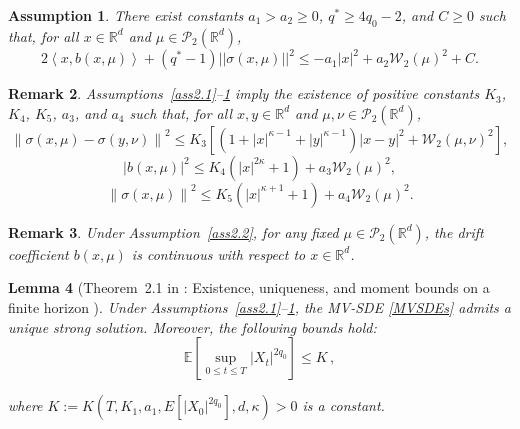 \documentclass[12pt]{article}
\numberwithin{equation}{section}
\newtheorem{assumption}{Assumption}[section]
\newtheorem{remark}[assumption]{Remark}
\newtheorem{lemma}[assumption]{Lemma}
\begin{document}
\begin{assumption}\label{ass2.4}
There exist constants $a_1>a_2\geq 0$, $q^*\geq 4q_0-2$, and $C\geq 0$ such that, for all $x \in \mathbb{R}^d$ and $\mu \in \mathcal{P}_2\left(\mathbb{R}^d\right)$,
\begin{equation}\tag{2.13}\label{2.13}
2\left\langle x, b\left(x, \mu\right)\right\rangle+\left(q^*-1\right)\left|\left|\sigma\left(x, \mu\right)\right|\right|^2 \leq-a_1\left|x\right|^2+a_2 \mathcal{W}_2\left(\mu\right)^2+C.
\end{equation}
\end{assumption}
\begin{remark}\label{remark 2.5}
 Assumptions~\ref{ass2.1}--\ref{ass2.4} imply the existence of positive constants $K_3$, $K_4$, $K_5$, $a_3$, and $a_4$ such that, for all $x, y \in \mathbb{R}^d$ and $\mu, \nu \in \mathcal{P}_2\left(\mathbb{R}^d\right)$,
\begin{equation}\tag{2.14}\label{2.14}
\left\|\sigma \left( x,\mu \right) -\sigma \left( y,\nu \right) \right\|^2\leq K_3\left[ \left( 1+\left|x\right|^{\kappa -1}+\left|y\right|^{\kappa -1} \right) \left|x-y\right|^2+\mathcal{W}_2\left( \mu ,\nu \right) ^2 \right] ,
    \end{equation}
    \begin{equation}\tag{2.15}\label{2.15}
    \left|b\left( x,\mu \right) \right|^2\leq K_4\left( \left|x\right|^{2\kappa}+1 \right) +a_3\mathcal{W}_2\left( \mu \right) ^2 ,
    \end{equation}
    \begin{equation}\tag{2.16}\label{2.16}
    \left\|\sigma \left( x,\mu \right) \right\|^2\leq K_5\left( \left|x\right|^{\kappa+1}+1\right) +a_4\mathcal{W}_2\left( \mu \right) ^2 .
    \end{equation}
\end{remark}
\begin{remark}\label{remark 2.6}
Under Assumption~\ref{ass2.2}, for any fixed $\mu \in \mathcal{P}_2\left(\mathbb{R}^d\right)$, the drift coefficient $b\left(x, \mu\right)$ is continuous with respect to $x \in \mathbb{R}^d$.
\end{remark}
\begin{lemma}[Theorem~2.1 in \cite{Kumar2022Well-posedness}: Existence, uniqueness, and moment bounds on a finite horizon ]\label{lem:Well-posedness}
Under Assumptions~\ref{ass2.1}--\ref{ass2.4}, the MV-SDE \eqref{MVSDEs} admits a unique strong solution. Moreover, the following bounds hold:
\begin{equation}\tag{2.17}\label{2.17}
\mathbb{E}\left[\underset{0\leqslant t\leqslant T}{\sup}\left|X_t\right|^{2q_0}\right]\leq K\,, 
\end{equation}

where $K:=K\left(T,  K_{1},a_{1},E\left[\left|X_0\right|^{2q_0}\right],d,\kappa \right) >0$ is a constant.  
\end{lemma}
\end{document}
